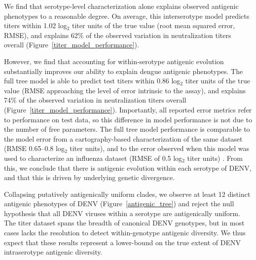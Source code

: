 We find that serotype-level characterization alone explains observed antigenic phenotypes to a reasonable degree.
On average, this interserotype model predicts titers within 1.02 log$_2$ titer units of the true value (root mean squared error, RMSE), and explains 62\% of the observed variation in neutralization titers overall (Figure~\ref{titer_model_performance}).

However, we find that accounting for within-serotype antigenic evolution substantially improves our ability to explain dengue antigenic phenotypes.
The full tree model is able to predict test titers within 0.86 log$_2$ titer units of the true value (RMSE approaching the level of error intrinsic to the assay), and explains 74\% of the observed variation in neutralization titers overall (Figure~\ref{titer_model_performance}).
Importantly, all reported error metrics refer to performance on test data, so this difference in model performance is not due to the number of free parameters.
The full tree model performance is comparable to the model error from a cartography-based characterization of the same dataset (RMSE 0.65--0.8 log$_2$ titer units), and to the error observed when this model was used to characterize an influenza dataset (RMSE of 0.5 log$_2$ titer units) \citep{katzelnick2015dengue,neher2016prediction}.
From this, we conclude that there is antigenic evolution within each serotype of DENV, and that this is driven by underlying genetic divergence.

Collapsing putatively antigenically uniform clades, we observe at least 12 distinct antigenic phenotypes of DENV (Figure~\ref{antigenic_tree}) and reject the null hypothesis that all DENV viruses within a serotype are antigenically uniform.
The titer dataset spans the breadth of canonical DENV genotypes, but in most cases lacks the resolution to detect within-genotype antigenic diversity.
We thus expect that these results represent a lower-bound on the true extent of DENV intraserotype antigenic diversity.

